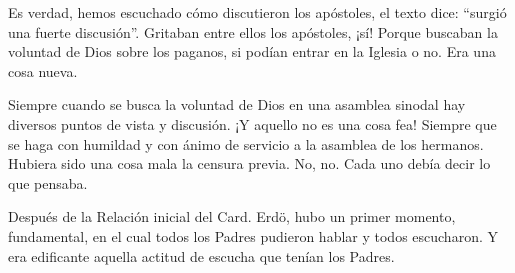 \documentclass[letterpaper]{report}
\begin{document}
		Es verdad, hemos escuchado cómo discutieron los apóstoles, el texto dice: “surgió una
		fuerte discusión”. Gritaban entre ellos los apóstoles, ¡sí! Porque buscaban la
		voluntad de Dios sobre los paganos, si podían entrar en la Iglesia o no. 
		Era una cosa nueva.

		Siempre cuando se busca la voluntad de Dios en una asamblea sinodal hay diversos
		puntos de vista y discusión. ¡Y aquello no es una cosa fea! Siempre que se haga con
		humildad y con ánimo de servicio a la asamblea de los hermanos. Hubiera sido una cosa
		mala la censura previa. No, no. Cada uno debía decir lo que pensaba.
		
		Después de la Relación inicial del Card. Erdö, hubo un primer momento, fundamental,
		en el cual todos los Padres pudieron hablar y todos escucharon. Y era edificante
		aquella actitud de escucha que tenían los Padres.
		
\end{document}
